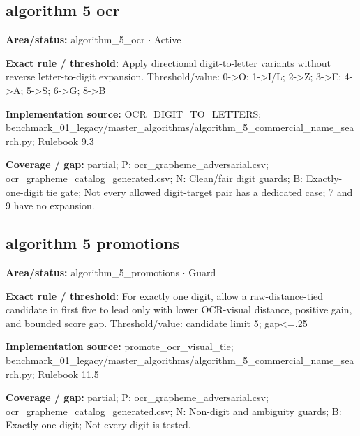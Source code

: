 \subsection*{algorithm 5 ocr}
\begin{tcolorbox}[enhanced,breakable,colback=white,colframe=Muted!45,boxrule=0.45pt,arc=1.5pt,left=6pt,right=6pt,top=5pt,bottom=5pt,title={\texttt{A5-OCR-DIGITS-11}},title after break={\texttt{A5-OCR-DIGITS-11}\ (continued)},fonttitle=\headingfont\bfseries\color{Navy},coltitle=Navy]
\textbf{Area/status:} algorithm\_\allowbreak{}5\_\allowbreak{}ocr $\boldsymbol{\cdot}$ Active\par
\smallskip
\textbf{Exact rule / threshold:} Apply directional digit-to-letter variants without reverse letter-to-digit expansion. Threshold/\allowbreak{}value: 0->O; 1->I/\allowbreak{}L; 2->Z; 3->E; 4->A; 5->S; 6->G; 8->B\par
\smallskip
\textbf{Implementation source:} OCR\_\allowbreak{}DIGIT\_\allowbreak{}TO\_\allowbreak{}LETTERS; benchmark\_\allowbreak{}01\_\allowbreak{}legacy/\allowbreak{}master\_\allowbreak{}algorithms/\allowbreak{}algorithm\_\allowbreak{}5\_\allowbreak{}commercial\_\allowbreak{}name\_\allowbreak{}search.py; Rulebook 9.3\par
\smallskip
\textbf{Coverage / gap:} partial; P: ocr\_\allowbreak{}grapheme\_\allowbreak{}adversarial.csv; ocr\_\allowbreak{}grapheme\_\allowbreak{}catalog\_\allowbreak{}generated.csv; N: Clean/\allowbreak{}fair digit guards; B: Exactly-one-digit tie gate; Not every allowed digit-target pair has a dedicated case; 7 and 9 have no expansion.
\end{tcolorbox}
\medskip
\subsection*{algorithm 5 promotions}
\begin{tcolorbox}[enhanced,breakable,colback=white,colframe=Muted!45,boxrule=0.45pt,arc=1.5pt,left=6pt,right=6pt,top=5pt,bottom=5pt,title={\texttt{A5-OCR-VISUAL-TIE-20}},title after break={\texttt{A5-OCR-VISUAL-TIE-20}\ (continued)},fonttitle=\headingfont\bfseries\color{Navy},coltitle=Navy]
\textbf{Area/status:} algorithm\_\allowbreak{}5\_\allowbreak{}promotions $\boldsymbol{\cdot}$ Guard\par
\smallskip
\textbf{Exact rule / threshold:} For exactly one digit, allow a raw-distance-tied candidate in first five to lead only with lower OCR-visual distance, positive gain, and bounded score gap. Threshold/\allowbreak{}value: candidate limit 5; gap<=.25\par
\smallskip
\textbf{Implementation source:} promote\_\allowbreak{}ocr\_\allowbreak{}visual\_\allowbreak{}tie; benchmark\_\allowbreak{}01\_\allowbreak{}legacy/\allowbreak{}master\_\allowbreak{}algorithms/\allowbreak{}algorithm\_\allowbreak{}5\_\allowbreak{}commercial\_\allowbreak{}name\_\allowbreak{}search.py; Rulebook 11.5\par
\smallskip
\textbf{Coverage / gap:} partial; P: ocr\_\allowbreak{}grapheme\_\allowbreak{}adversarial.csv; ocr\_\allowbreak{}grapheme\_\allowbreak{}catalog\_\allowbreak{}generated.csv; N: Non-digit and ambiguity guards; B: Exactly one digit; Not every digit is tested.
\end{tcolorbox}
\medskip
